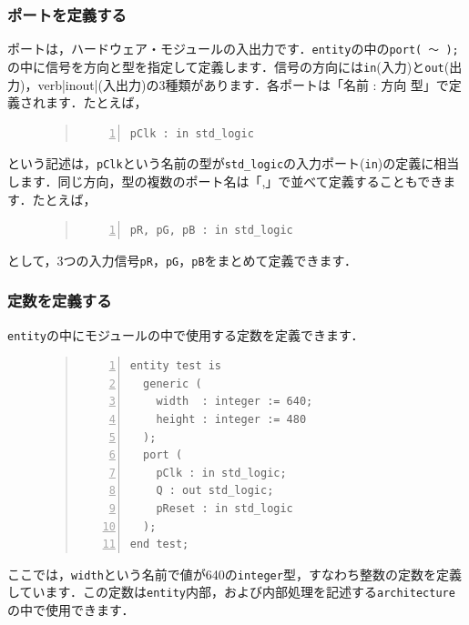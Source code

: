 \documentclass[a4paper,dvipdfmx]{jsarticle}
\begin{document}
\subsubsection{ポートを定義する}
ポートは，ハードウェア・モジュールの入出力です．\verb|entity|の中の\verb|port( 〜 );|の中に信号を方向と型を指定して定義します．信号の方向には\verb|in|(入力)と\verb|out|(出力)，verb|inout|(入出力)の3種類があります．各ポートは「名前 : 方向 型」で定義されます．たとえば，
\begin{figure}[H]
\begin{quote}
\begin{Verbatim}[frame=single, numbers=left, baselinestretch=0.8]
pClk : in std_logic
\end{Verbatim}
\end{quote}
\end{figure}
という記述は，\verb|pClk|という名前の型が\verb|std_logic|の入力ポート(\verb|in|)の定義に相当します．同じ方向，型の複数のポート名は「,」で並べて定義することもできます．たとえば，
\begin{figure}[H]
\begin{quote}
\begin{Verbatim}[frame=single, numbers=left, baselinestretch=0.8]
pR, pG, pB : in std_logic
\end{Verbatim}
\end{quote}
\end{figure}
として，3つの入力信号\verb|pR|，\verb|pG|，\verb|pB|をまとめて定義できます．

\subsubsection{定数を定義する}
\verb|entity|の中にモジュールの中で使用する定数を定義できます．
\begin{figure}[H]
\begin{quote}
\begin{Verbatim}[frame=single, numbers=left, baselinestretch=0.8]
entity test is
  generic (
    width  : integer := 640;
    height : integer := 480
  );
  port (
    pClk : in std_logic;
    Q : out std_logic;
    pReset : in std_logic
  );
end test;
\end{Verbatim}
\end{quote}
\end{figure}
ここでは，\verb|width|という名前で値が640の\verb|integer|型，すなわち整数の定数を定義しています．この定数は\verb|entity|内部，および内部処理を記述する\verb|architecture|の中で使用できます．
\end{document}
